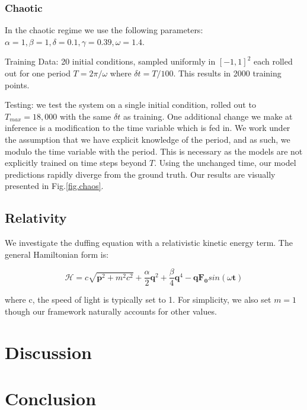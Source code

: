\documentclass[twoside]{article}
\begin{document}
\subsubsection{Chaotic}

In the chaotic regime we use the following parameters:
$\alpha =1,\beta=1,\delta=0.1,\gamma=0.39,\omega=1.4$. 

Training Data: 20 initial conditions, sampled uniformly in $[-1,1]^2$ each rolled out for one period $T=2\pi/\omega$ where $\delta t = T/100$. This results in 2000 training points.

Testing: we test the system on a single initial condition, rolled out to $T_{max} = 18,000$ with the same $\delta t$ as training. One additional change we make at inference is a modification to the time variable which is fed in. We work under the assumption that we have explicit knowledge of the period, and as such, we modulo the time variable with the period. This is necessary as the models are not explicitly trained on time steps beyond $T$. Using the unchanged time, our model predictions rapidly diverge from the ground truth. Our results are visually presented in Fig.\ref{fig.chaos}.  
\subsection{Relativity}

We investigate the duffing equation with a relativistic kinetic energy term. The general Hamiltonian form is:

\begin{equation}
\mathcal{H} =  c\sqrt{\mathbf{p}^2 +m^2c^2} + \frac{\alpha}{2}\mathbf{q}^2 +\frac{\beta}{4}\mathbf{q}^4 - \mathbf{q}\mathbf{F_0}sin(\omega \mathbf{t})
\end{equation}

where c, the speed of light is typically set to 1. For simplicity, we also set $m=1$ though our framework naturally accounts for other values.

\section{Discussion}

\section{Conclusion}
\end{document}

